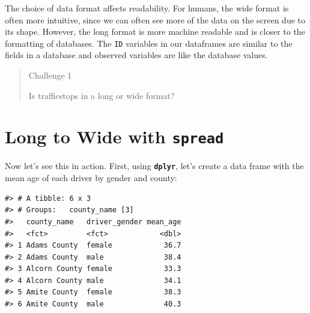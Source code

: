 \documentclass[]{book}
\newenvironment{Shaded}{\begin{snugshade}}{\end{snugshade}}
\newcommand{\DataTypeTok}[1]{\textcolor[rgb]{0.13,0.29,0.53}{#1}}
\newcommand{\KeywordTok}[1]{\textcolor[rgb]{0.13,0.29,0.53}{\textbf{#1}}}
\newcommand{\NormalTok}[1]{#1}
\newcommand{\OperatorTok}[1]{\textcolor[rgb]{0.81,0.36,0.00}{\textbf{#1}}}
\newcommand{\OtherTok}[1]{\textcolor[rgb]{0.56,0.35,0.01}{#1}}
\newcommand{\StringTok}[1]{\textcolor[rgb]{0.31,0.60,0.02}{#1}}
\begin{document}
The choice of data format affects readability. For humans, the wide format is often more intuitive, since we can often see more of the data on the screen due to its shape. However, the long format is more machine readable and is closer to the formatting of databases. The \texttt{ID} variables in our dataframes are similar to the fields in a database and observed variables are like the database values.

\begin{quote}
Challenge 1

Is trafficstops in a long or wide format?
\end{quote}

\hypertarget{long-to-wide-with-spread}{%
\section{\texorpdfstring{Long to Wide with \texttt{spread}}{Long to Wide with spread}}\label{long-to-wide-with-spread}}

Now let's see this in action. First, using \textbf{\texttt{dplyr}}, let's create a data frame
with the mean age of each driver by gender and county:

\begin{Shaded}
\end{Shaded}

\begin{verbatim}
#> # A tibble: 6 x 3
#> # Groups:   county_name [3]
#>   county_name   driver_gender mean_age
#>   <fct>         <fct>            <dbl>
#> 1 Adams County  female            36.7
#> 2 Adams County  male              38.4
#> 3 Alcorn County female            33.3
#> 4 Alcorn County male              34.1
#> 5 Amite County  female            38.3
#> 6 Amite County  male              40.3
\end{verbatim}
\end{document}
